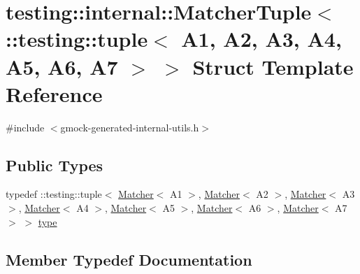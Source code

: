 \hypertarget{structtesting_1_1internal_1_1MatcherTuple_3_01_1_1testing_1_1tuple_3_01A1_00_01A2_00_01A3_00_01A63c742e825c64dbe2671b0a407b3db47}{}\section{testing\+::internal\+::Matcher\+Tuple$<$ \+::testing\+::tuple$<$ A1, A2, A3, A4, A5, A6, A7 $>$ $>$ Struct Template Reference}
\label{structtesting_1_1internal_1_1MatcherTuple_3_01_1_1testing_1_1tuple_3_01A1_00_01A2_00_01A3_00_01A63c742e825c64dbe2671b0a407b3db47}


{\ttfamily \#include $<$gmock-\/generated-\/internal-\/utils.\+h$>$}

\subsection*{Public Types}
\begin{DoxyCompactItemize}
\item 
typedef \+::testing\+::tuple$<$ \mbox{\hyperlink{classtesting_1_1Matcher}{Matcher}}$<$ A1 $>$, \mbox{\hyperlink{classtesting_1_1Matcher}{Matcher}}$<$ A2 $>$, \mbox{\hyperlink{classtesting_1_1Matcher}{Matcher}}$<$ A3 $>$, \mbox{\hyperlink{classtesting_1_1Matcher}{Matcher}}$<$ A4 $>$, \mbox{\hyperlink{classtesting_1_1Matcher}{Matcher}}$<$ A5 $>$, \mbox{\hyperlink{classtesting_1_1Matcher}{Matcher}}$<$ A6 $>$, \mbox{\hyperlink{classtesting_1_1Matcher}{Matcher}}$<$ A7 $>$ $>$ \mbox{\hyperlink{structtesting_1_1internal_1_1MatcherTuple_3_01_1_1testing_1_1tuple_3_01A1_00_01A2_00_01A3_00_01A63c742e825c64dbe2671b0a407b3db47_a733b8ef9996b7f465e9018393bec5cc4}{type}}
\end{DoxyCompactItemize}


\subsection{Member Typedef Documentation}
\mbox{\label{structtesting_1_1internal_1_1MatcherTuple_3_01_1_1testing_1_1tuple_3_01A1_00_01A2_00_01A3_00_01A63c742e825c64dbe2671b0a407b3db47_a733b8ef9996b7f465e9018393bec5cc4}} 
